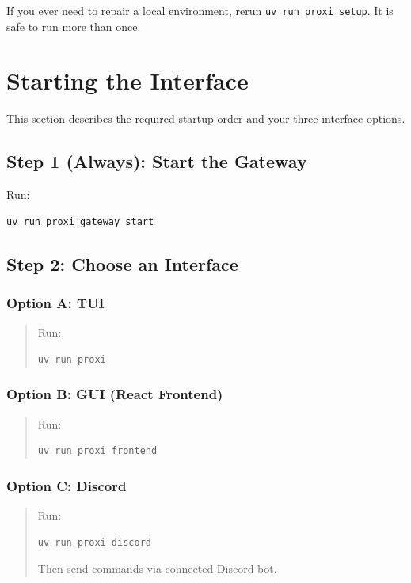 \documentclass{article}
\begin{document}
If you ever need to repair a local environment, rerun \texttt{uv run proxi setup}. It is safe to run more than once.

\section{Starting the Interface}

This section describes the required startup order and your three interface options.

\subsection{Step 1 (Always): Start the Gateway}
Run:

\begin{verbatim}
uv run proxi gateway start
\end{verbatim}

\subsection{Step 2: Choose an Interface}

\subsubsection{Option A: TUI}
\begin{quote}
Run:

\begin{verbatim}
uv run proxi
\end{verbatim}
\end{quote}

\subsubsection{Option B: GUI (React Frontend)}
\begin{quote}
Run:

\begin{verbatim}
uv run proxi frontend
\end{verbatim}
\end{quote}

\subsubsection{Option C: Discord}
\begin{quote}
Run:

\begin{verbatim}
uv run proxi discord
\end{verbatim}

Then send commands via connected Discord bot.
\end{quote}
\end{document}
